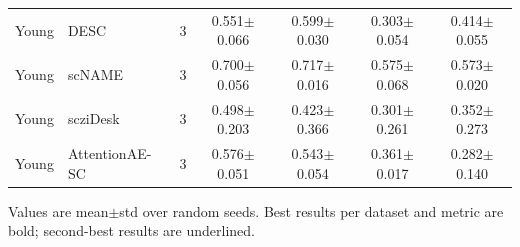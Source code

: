 \begin{table}[t]
\begin{tabular}{llrcccc}
Young & DESC & 3 & 0.551$\pm$0.066 & 0.599$\pm$0.030 & 0.303$\pm$0.054 & 0.414$\pm$0.055 \\
Young & scNAME & 3 & 0.700$\pm$0.056 & 0.717$\pm$0.016 & 0.575$\pm$0.068 & 0.573$\pm$0.020 \\
Young & scziDesk & 3 & 0.498$\pm$0.203 & 0.423$\pm$0.366 & 0.301$\pm$0.261 & 0.352$\pm$0.273 \\
Young & AttentionAE-SC & 3 & 0.576$\pm$0.051 & 0.543$\pm$0.054 & 0.361$\pm$0.017 & 0.282$\pm$0.140 \\
\bottomrule
\end{tabular}
\vspace{2pt}
\footnotesize Values are mean$\pm$std over random seeds. Best results per dataset and metric are bold; second-best results are underlined.
\end{table}
